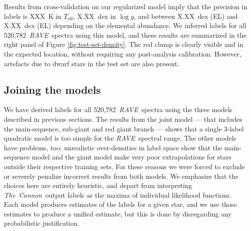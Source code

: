 \documentclass[preprint,trackchanges]{aastex}
\newcommand{\acronym}[1]{{\small{#1}}}
\newcommand{\project}[1]{\textsl{#1}}
\newcommand{\thecannon}{\project{The~Cannon}}
\newcommand{\rave}{\project{\acronym{RAVE}}}
\newcommand{\teff}{T_{\mathrm{eff}}}
\newcommand{\logg}{\log g}
\newcommand{\Nspectra}{520,782}
\begin{document}
Results from cross-validation on our regularized model imply that the precision
in labels is XXX~K in $\teff$, X.XX~dex in $\logg$, and between X.XX~dex (EL) and 
X.XX~dex (EL) depending on the elemental abundance.  We inferred labels for all
\Nspectra\ \rave\ spectra using this model, and these results are summarized in
the right panel of Figure \ref{fig:test-set-density}.  The red clump is clearly visible
and in the expected location, without requiring any post-analysis calibration.
However, artefacts due to dwarf stars in the test set are also present.


\subsection{Joining the models}
\label{sec:joining-the-models}

We have derived labels for all \Nspectra\ \rave\ spectra using the three models
described in previous sections.  The results from the joint model --- that includes 
the main-sequence, sub-giant and red giant branch --- shows that a single 3-label quadratic
model is too simple for the \rave\ spectral range.  The other models have problems,
too: unrealistic over-densities in label space show that the main-sequence model and
the giant model make very poor extrapolations for stars outside their respective
training sets.  For these reasons we were forced to exclude or severely penalize 
incorrect results from both models.  We emphasize that the choices here are entirely
heuristic, and depart from interpreting \thecannon\ output labels as the maxima
of individual likelihood functions.  Each model produces estimates of the labels
for a given star, and we use those estimates to produce a unified estimate, but 
this is done by disregarding any probabilistic justification.
\end{document}
